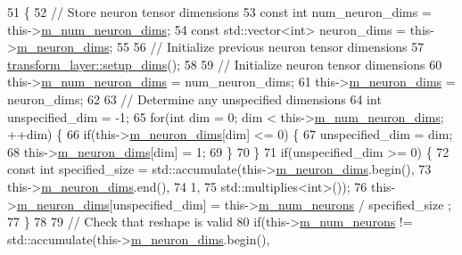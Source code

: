 \begin{DoxyCode}
51                              \{
52     \textcolor{comment}{// Store neuron tensor dimensions}
53     \textcolor{keyword}{const} \textcolor{keywordtype}{int} num\_neuron\_dims = this->\hyperlink{classlbann_1_1Layer_adfd6178d21498c9095cd947ae1eb2d6a}{m\_num\_neuron\_dims};
54     \textcolor{keyword}{const} std::vector<int> neuron\_dims = this->\hyperlink{classlbann_1_1Layer_abb34bb8031f57a483e2e327a5f229f48}{m\_neuron\_dims};
55 
56     \textcolor{comment}{// Initialize previous neuron tensor dimensions}
57     \hyperlink{classlbann_1_1Layer_a90fce1b06c1f2abb480e18cfe08a9746}{transform\_layer::setup\_dims}();
58 
59     \textcolor{comment}{// Initialize neuron tensor dimensions}
60     this->\hyperlink{classlbann_1_1Layer_adfd6178d21498c9095cd947ae1eb2d6a}{m\_num\_neuron\_dims} = num\_neuron\_dims;
61     this->\hyperlink{classlbann_1_1Layer_abb34bb8031f57a483e2e327a5f229f48}{m\_neuron\_dims} = neuron\_dims;
62 
63     \textcolor{comment}{// Determine any unspecified dimensions}
64     \textcolor{keywordtype}{int} unspecified\_dim = -1;
65     \textcolor{keywordflow}{for}(\textcolor{keywordtype}{int} dim = 0; dim < this->\hyperlink{classlbann_1_1Layer_adfd6178d21498c9095cd947ae1eb2d6a}{m\_num\_neuron\_dims}; ++dim) \{
66       \textcolor{keywordflow}{if}(this->\hyperlink{classlbann_1_1Layer_abb34bb8031f57a483e2e327a5f229f48}{m\_neuron\_dims}[dim] <= 0) \{
67         unspecified\_dim = dim;
68         this->\hyperlink{classlbann_1_1Layer_abb34bb8031f57a483e2e327a5f229f48}{m\_neuron\_dims}[dim] = 1;
69       \}
70     \}
71     \textcolor{keywordflow}{if}(unspecified\_dim >= 0) \{
72       \textcolor{keyword}{const} \textcolor{keywordtype}{int} specified\_size = std::accumulate(this->\hyperlink{classlbann_1_1Layer_abb34bb8031f57a483e2e327a5f229f48}{m\_neuron\_dims}.begin(),
73                                                  this->\hyperlink{classlbann_1_1Layer_abb34bb8031f57a483e2e327a5f229f48}{m\_neuron\_dims}.end(),
74                                                  1,
75                                                  std::multiplies<int>());
76       this->\hyperlink{classlbann_1_1Layer_abb34bb8031f57a483e2e327a5f229f48}{m\_neuron\_dims}[unspecified\_dim] = this->\hyperlink{classlbann_1_1Layer_a6b5ebc8a7d9329d8a773ed787e7b41d8}{m\_num\_neurons} / specified\_size
      ;
77     \}
78 
79     \textcolor{comment}{// Check that reshape is valid}
80     \textcolor{keywordflow}{if}(this->\hyperlink{classlbann_1_1Layer_a6b5ebc8a7d9329d8a773ed787e7b41d8}{m\_num\_neurons} != std::accumulate(this->\hyperlink{classlbann_1_1Layer_abb34bb8031f57a483e2e327a5f229f48}{m\_neuron\_dims}.begin(),

\end{DoxyCode}
